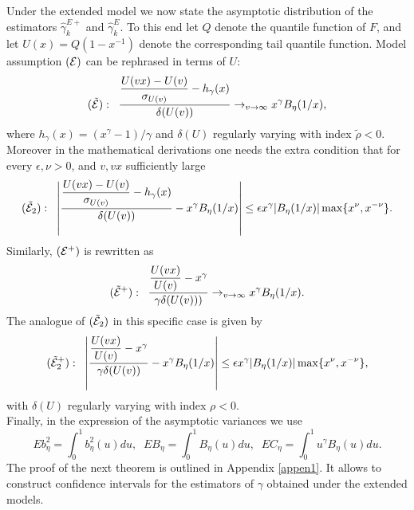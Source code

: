 \vspace{0.3cm}\noindent
Under the extended model we now state the asymptotic distribution of the estimators $\hat{\gamma}_k^{E+}$ and $\hat{\gamma}_k^{E}$. To this end let $Q$ denote the quantile function of $F$, and let $U(x)=Q(1-x^{-1})$ denote the corresponding tail quantile function. 
Model assumption $({\cal{E}})$ can be rephrased in terms of $U$: 
\[
({\tilde{\cal{E}}}):\;\;
\dfrac{\dfrac{U(vx)-U(v)}{\sigma_{U(v)}} -h_{\gamma}(x)}{\delta (U(v))} \to _{v \to \infty} x^{\gamma} B_{\eta}(1/x),
\]
where $h_{\gamma}(x)= (x^{\gamma}-1)/\gamma$ and $\delta (U)$ regularly varying with index $\tilde\rho<0$. 
Moreover in the mathematical derivations one needs the extra condition that for every $\epsilon,\nu>0$, and $v, vx$ sufficiently large
\[
({\tilde{\cal{E}}}_2):\;\;
\left| \dfrac{\dfrac{U(vx)-U(v)}{\sigma_{U(v)}} -h_{\gamma}(x)}{\delta (U(v))} - x^{\gamma} B_{\eta}(1/x) \right| \leq \epsilon x^{\gamma}|B_{\eta}(1/x)| \max\{x^{\nu},x^{-\nu}\}.
\]
Similarly, $({\cal{E}}^+)$ is rewritten as
\[
({\tilde{\cal{E}}}^+):\;\;
\dfrac{\dfrac{U(vx)}{U(v)} - x^{\gamma}}{\gamma \delta(U(v)))} \to_{v \to \infty} x^{\gamma} B_{\eta}(1/x).
\]
The analogue of 
$({\tilde{\cal{E}}}_2)$ in this specific case is given by
\[
({\tilde{\cal{E}}}_2^+):\;\;
\left| \dfrac{\dfrac{U(vx)}{U(v)} - x^{\gamma}}{\gamma\delta(U(v))} -
x^{\gamma} B_{\eta}(1/x) \right|
 \leq \epsilon x^{\gamma}|B_{\eta}(1/x)| \max\{x^{\nu},x^{-\nu}\},
\]
with $\delta(U)$ regularly varying with index $\rho <0$.\\
Finally, in the expression of the asymptotic variances we use 
\[
Eb^2_{\eta} = \int_0^1 b^2_{\eta} (u)du, \;\;
EB_{\eta} = \int_0^1 B_{\eta} (u)du, \;\;
EC_{\eta} = \int_0^1 u^{\gamma}B_{\eta} (u)du.
\]
The proof of the next theorem is outlined in Appendix \ref{appen1}. It allows to construct confidence intervals for the estimators of $\gamma$ obtained under the extended models.\\
